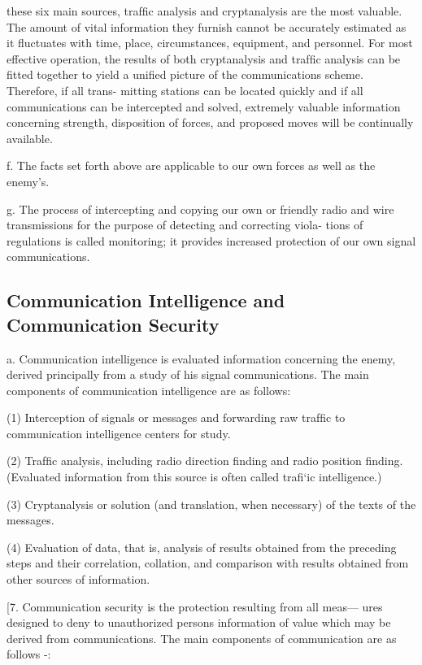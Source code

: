 these six main sources, trafﬁc analysis and cryptanalysis are the most
valuable. The amount of vital information they furnish cannot be
accurately estimated as it ﬂuctuates with time, place, circumstances,
equipment, and personnel. For most effective operation, the results of
both cryptanalysis and trafﬁc analysis can be ﬁtted together to yield a
uniﬁed picture of the communications scheme. Therefore, if all trans-
mitting stations can be located quickly and if all communications can be
intercepted and solved, extremely valuable information concerning
strength, disposition of forces, and proposed moves will be continually
available.

f. The facts set forth above are applicable to our own forces as well
as the enemy’s.

g. The process of intercepting and copying our own or friendly radio
and wire transmissions for the purpose of detecting and correcting viola-
tions of regulations is called monitoring; it provides increased protection
of our own signal communications.

\subsection{Communication Intelligence and Communication Security}

a. Communication intelligence is evaluated information concerning the
enemy, derived principally from a study of his signal communications.
The main components of communication intelligence are as follows:

(1) Interception of signals or messages and forwarding raw trafﬁc
to communication intelligence centers for study.

(2) Trafﬁc analysis, including radio direction ﬁnding and radio
position ﬁnding. (Evaluated information from this source is
often called traﬁ‘ic intelligence.)

(3) Cryptanalysis or solution (and translation, when necessary) of
the texts of the messages.

(4) Evaluation of data, that is, analysis of results obtained from the
preceding steps and their correlation, collation, and comparison
with results obtained from other sources of information.

[7. Communication security is the protection resulting from all meas—
ures designed to deny to unauthorized persons information of value
which may be derived from communications. The main components of
communication are as follows -:

